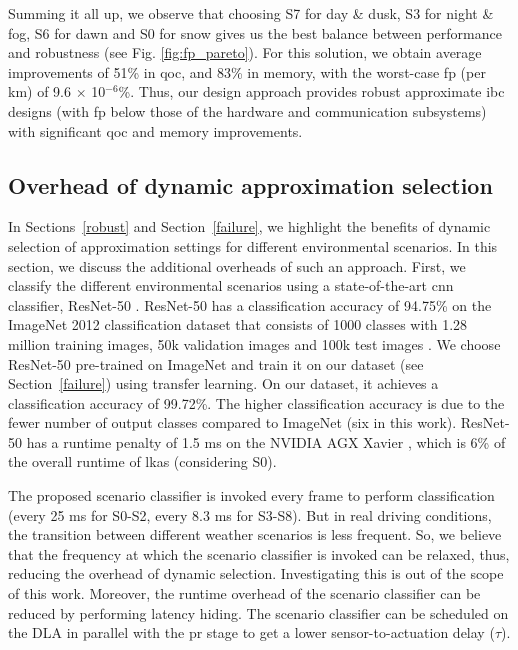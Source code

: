 \par Summing it all up, we observe that choosing S7 for day \& dusk, S3 for night \& fog, S6 for dawn and S0 for snow gives us the best balance between performance and robustness (see Fig. \ref{fig:fp_pareto}). For this solution, we obtain average improvements of 51\% in \gls{qoc}, and 83\% in memory, with the worst-case \gls{fp} (per km) of 9.6 $\times$ 10$^{-6}$\%. Thus, our design approach provides robust approximate \gls{ibc} designs (with \gls{fp} below those of the hardware and communication subsystems) with significant \gls{qoc} and memory improvements.  

\subsection{Overhead of dynamic approximation selection}
In Sections~\ref{robust} and Section~\ref{failure}, we highlight the benefits of dynamic selection of approximation settings for different environmental scenarios. In this section, we discuss the additional overheads of such an approach. First, we classify the different environmental scenarios using a state-of-the-art \gls{cnn} classifier, ResNet-50 \cite{resnet}. ResNet-50 has a classification accuracy of 94.75\% on the ImageNet 2012 classification dataset that consists of 1000 classes with 1.28 million training images, 50k validation images and 100k test images \cite{resnet}. We choose ResNet-50 pre-trained on ImageNet and train it on our dataset (see Section~\ref{failure}) using transfer learning. On our dataset, it achieves a classification accuracy of 99.72\%. The higher classification accuracy is due to the fewer number of output classes compared to ImageNet (six in this work). ResNet-50 has a runtime penalty of 1.5 ms on the NVIDIA AGX Xavier \cite{resnet_runtime}, which is 6\% of the overall runtime of \gls{lkas} (considering S0). 
\par The proposed scenario classifier is invoked every frame to perform classification (every 25 ms for S0-S2, every 8.3 ms for S3-S8). But in real driving conditions, the transition between different weather scenarios is less frequent. So, we believe that the frequency at which the scenario classifier is invoked can be relaxed, thus, reducing the overhead of dynamic selection. Investigating this is out of the scope of this work. Moreover, the runtime overhead of the scenario classifier can be reduced by performing latency hiding. The scenario classifier can be scheduled on the DLA in parallel with the \gls{pr} stage to get a lower sensor-to-actuation delay ($\tau$).   

